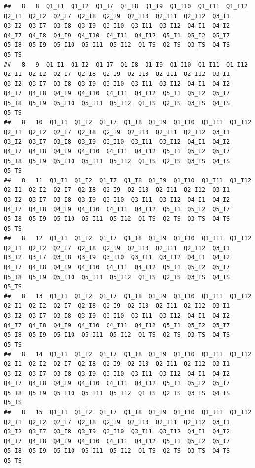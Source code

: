 \documentclass[
]{book}
\begin{document}
\begin{verbatim}
##   8   8  Q1_I1  Q1_I2  Q1_I7  Q1_I8  Q1_I9  Q1_I10  Q1_I11  Q1_I12  Q2_I1  Q2_I2  Q2_I7  Q2_I8  Q2_I9  Q2_I10  Q2_I11  Q2_I12  Q3_I1  Q3_I2  Q3_I7  Q3_I8  Q3_I9  Q3_I10  Q3_I11  Q3_I12  Q4_I1  Q4_I2  Q4_I7  Q4_I8  Q4_I9  Q4_I10  Q4_I11  Q4_I12  Q5_I1  Q5_I2  Q5_I7  Q5_I8  Q5_I9  Q5_I10  Q5_I11  Q5_I12  Q1_TS  Q2_TS  Q3_TS  Q4_TS  Q5_TS
##   8   9  Q1_I1  Q1_I2  Q1_I7  Q1_I8  Q1_I9  Q1_I10  Q1_I11  Q1_I12  Q2_I1  Q2_I2  Q2_I7  Q2_I8  Q2_I9  Q2_I10  Q2_I11  Q2_I12  Q3_I1  Q3_I2  Q3_I7  Q3_I8  Q3_I9  Q3_I10  Q3_I11  Q3_I12  Q4_I1  Q4_I2  Q4_I7  Q4_I8  Q4_I9  Q4_I10  Q4_I11  Q4_I12  Q5_I1  Q5_I2  Q5_I7  Q5_I8  Q5_I9  Q5_I10  Q5_I11  Q5_I12  Q1_TS  Q2_TS  Q3_TS  Q4_TS  Q5_TS
##   8   10  Q1_I1  Q1_I2  Q1_I7  Q1_I8  Q1_I9  Q1_I10  Q1_I11  Q1_I12  Q2_I1  Q2_I2  Q2_I7  Q2_I8  Q2_I9  Q2_I10  Q2_I11  Q2_I12  Q3_I1  Q3_I2  Q3_I7  Q3_I8  Q3_I9  Q3_I10  Q3_I11  Q3_I12  Q4_I1  Q4_I2  Q4_I7  Q4_I8  Q4_I9  Q4_I10  Q4_I11  Q4_I12  Q5_I1  Q5_I2  Q5_I7  Q5_I8  Q5_I9  Q5_I10  Q5_I11  Q5_I12  Q1_TS  Q2_TS  Q3_TS  Q4_TS  Q5_TS
##   8   11  Q1_I1  Q1_I2  Q1_I7  Q1_I8  Q1_I9  Q1_I10  Q1_I11  Q1_I12  Q2_I1  Q2_I2  Q2_I7  Q2_I8  Q2_I9  Q2_I10  Q2_I11  Q2_I12  Q3_I1  Q3_I2  Q3_I7  Q3_I8  Q3_I9  Q3_I10  Q3_I11  Q3_I12  Q4_I1  Q4_I2  Q4_I7  Q4_I8  Q4_I9  Q4_I10  Q4_I11  Q4_I12  Q5_I1  Q5_I2  Q5_I7  Q5_I8  Q5_I9  Q5_I10  Q5_I11  Q5_I12  Q1_TS  Q2_TS  Q3_TS  Q4_TS  Q5_TS
##   8   12  Q1_I1  Q1_I2  Q1_I7  Q1_I8  Q1_I9  Q1_I10  Q1_I11  Q1_I12  Q2_I1  Q2_I2  Q2_I7  Q2_I8  Q2_I9  Q2_I10  Q2_I11  Q2_I12  Q3_I1  Q3_I2  Q3_I7  Q3_I8  Q3_I9  Q3_I10  Q3_I11  Q3_I12  Q4_I1  Q4_I2  Q4_I7  Q4_I8  Q4_I9  Q4_I10  Q4_I11  Q4_I12  Q5_I1  Q5_I2  Q5_I7  Q5_I8  Q5_I9  Q5_I10  Q5_I11  Q5_I12  Q1_TS  Q2_TS  Q3_TS  Q4_TS  Q5_TS
##   8   13  Q1_I1  Q1_I2  Q1_I7  Q1_I8  Q1_I9  Q1_I10  Q1_I11  Q1_I12  Q2_I1  Q2_I2  Q2_I7  Q2_I8  Q2_I9  Q2_I10  Q2_I11  Q2_I12  Q3_I1  Q3_I2  Q3_I7  Q3_I8  Q3_I9  Q3_I10  Q3_I11  Q3_I12  Q4_I1  Q4_I2  Q4_I7  Q4_I8  Q4_I9  Q4_I10  Q4_I11  Q4_I12  Q5_I1  Q5_I2  Q5_I7  Q5_I8  Q5_I9  Q5_I10  Q5_I11  Q5_I12  Q1_TS  Q2_TS  Q3_TS  Q4_TS  Q5_TS
##   8   14  Q1_I1  Q1_I2  Q1_I7  Q1_I8  Q1_I9  Q1_I10  Q1_I11  Q1_I12  Q2_I1  Q2_I2  Q2_I7  Q2_I8  Q2_I9  Q2_I10  Q2_I11  Q2_I12  Q3_I1  Q3_I2  Q3_I7  Q3_I8  Q3_I9  Q3_I10  Q3_I11  Q3_I12  Q4_I1  Q4_I2  Q4_I7  Q4_I8  Q4_I9  Q4_I10  Q4_I11  Q4_I12  Q5_I1  Q5_I2  Q5_I7  Q5_I8  Q5_I9  Q5_I10  Q5_I11  Q5_I12  Q1_TS  Q2_TS  Q3_TS  Q4_TS  Q5_TS
##   8   15  Q1_I1  Q1_I2  Q1_I7  Q1_I8  Q1_I9  Q1_I10  Q1_I11  Q1_I12  Q2_I1  Q2_I2  Q2_I7  Q2_I8  Q2_I9  Q2_I10  Q2_I11  Q2_I12  Q3_I1  Q3_I2  Q3_I7  Q3_I8  Q3_I9  Q3_I10  Q3_I11  Q3_I12  Q4_I1  Q4_I2  Q4_I7  Q4_I8  Q4_I9  Q4_I10  Q4_I11  Q4_I12  Q5_I1  Q5_I2  Q5_I7  Q5_I8  Q5_I9  Q5_I10  Q5_I11  Q5_I12  Q1_TS  Q2_TS  Q3_TS  Q4_TS  Q5_TS

\end{verbatim}
\end{document}
